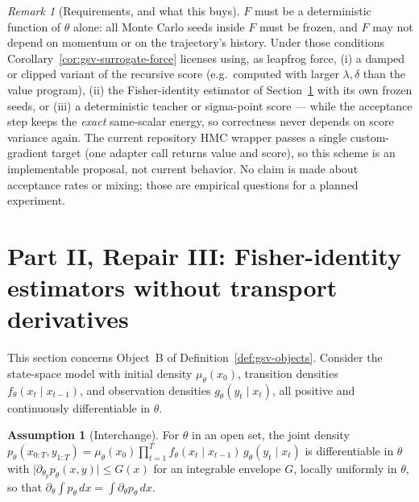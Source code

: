 \documentclass[11pt]{article}
\theoremstyle{definition}
\newtheorem{assumption}[proposition]{Assumption}
\theoremstyle{remark}
\newtheorem{remark}[proposition]{Remark}
\begin{document}
\begin{remark}[Requirements, and what this buys]
\label{rem:gsv-force-requirements}
$F$ must be a deterministic function of $\theta$ alone: all Monte Carlo seeds
inside $F$ must be frozen, and $F$ may not depend on momentum or on the
trajectory's history.  Under those conditions
Corollary~\ref{cor:gsv-surrogate-force} licenses using, as leapfrog force,
(i) a damped or clipped variant of the recursive score (e.g.\ computed with
larger $\lambda,\delta$ than the value program), (ii) the Fisher-identity
estimator of Section~\ref{sec:gsv-fisher} with its own frozen seeds, or
(iii) a deterministic teacher or sigma-point score --- while the acceptance
step keeps the \emph{exact} same-scalar energy, so correctness never depends
on score variance again.  The current repository HMC wrapper passes a single
custom-gradient target (one adapter call returns value and score), so this
scheme is an implementable proposal, not current behavior.  No claim is made
about acceptance rates or mixing; those are empirical questions for a
planned experiment.
\end{remark}

\section{Part II, Repair III: Fisher-identity estimators without transport
derivatives}
\label{sec:gsv-fisher}

This section concerns Object~B of Definition~\ref{def:gsv-objects}.  Consider
the state-space model with initial density $\mu_\theta(x_0)$, transition
densities $f_\theta(x_t\mid x_{t-1})$, and observation densities
$g_\theta(y_t\mid x_t)$, all positive and continuously differentiable in
$\theta$.

\begin{assumption}[Interchange]
\label{ass:gsv-interchange}
For $\theta$ in an open set, the joint density
$p_\theta(x_{0:T},y_{1:T})
=\mu_\theta(x_0)\prod_{t=1}^{T}f_\theta(x_t\mid x_{t-1})
 \,g_\theta(y_t\mid x_t)$
is differentiable in $\theta$ with
$\lvert\partial_{\theta_p}p_\theta(x,y)\rvert\le G(x)$ for an integrable
envelope $G$, locally uniformly in $\theta$, so that
$\partial_{\theta}\!\int p_\theta\,dx=\int\partial_\theta p_\theta\,dx$.
\end{assumption}
\end{document}
